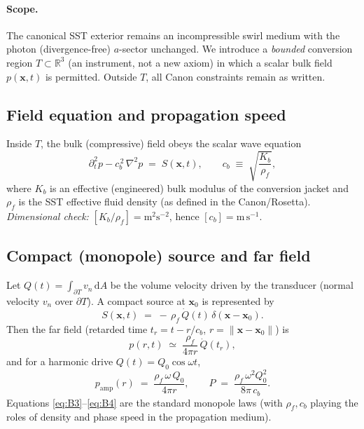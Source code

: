 \documentclass[10pt,reprint,aps,onecolumn,nofootinbib]{revtex4-2}
\begin{document}
    \paragraph{Scope.}
        The canonical SST exterior remains an incompressible swirl medium with the photon (divergence-free) $a$-sector unchanged. We introduce a \emph{bounded} conversion region $T\subset\mathbb{R}^3$ (an instrument, not a new axiom) in which a scalar bulk field $p(\mathbf{x},t)$ is permitted. Outside $T$, all Canon constraints remain as written.

    \subsection*{Field equation and propagation speed}
    Inside $T$, the bulk (compressive) field obeys the scalar wave equation
    \begin{equation}
        \partial_t^2 p - c_b^{\,2}\,\nabla^2 p \;=\; S(\mathbf{x},t),
        \qquad
        c_b \;\equiv\; \sqrt{\frac{K_b}{\rho_f}},
        \label{eq:B1}
    \end{equation}
    where $K_b$ is an effective (engineered) bulk modulus of the conversion jacket and $\rho_f$ is the SST effective fluid density (as defined in the Canon/Rosetta).
    \emph{Dimensional check:} $[K_b/\rho_f]=\mathrm{m}^2\mathrm{s}^{-2}$, hence $[c_b]=\mathrm{m\,s^{-1}}$.

    \subsection*{Compact (monopole) source and far field}
    Let $Q(t)=\int_{\partial T} v_n\,\mathrm{d}A$ be the volume velocity driven by the transducer (normal velocity $v_n$ over $\partial T$). A compact source at $\mathbf{x}_0$ is represented by
    \begin{equation}
        S(\mathbf{x},t)\;=\; -\,\rho_f\,\dot{Q}(t)\,\delta(\mathbf{x}-\mathbf{x}_0).
        \label{eq:B2}
    \end{equation}
    Then the far field (retarded time $t_r=t-r/c_b$, $r=\|\mathbf{x}-\mathbf{x}_0\|$) is
    \begin{equation}
        p(r,t) \;\simeq\; \frac{\rho_f}{4\pi r}\,\dot{Q}(t_r),
        \label{eq:B3}
    \end{equation}
    and for a harmonic drive $Q(t)=Q_0\cos\omega t$,
    \begin{equation}
        p_{\mathrm{amp}}(r)\;=\;\frac{\rho_f\,\omega\,Q_0}{4\pi r},
        \qquad
        P\;=\;\frac{\rho_f\,\omega^2 Q_0^2}{8\pi\,c_b}.
        \label{eq:B4}
    \end{equation}
    Equations \eqref{eq:B3}–\eqref{eq:B4} are the standard monopole laws (with $\rho_f,c_b$ playing the roles of density and phase speed in the propagation medium).
\end{document}
